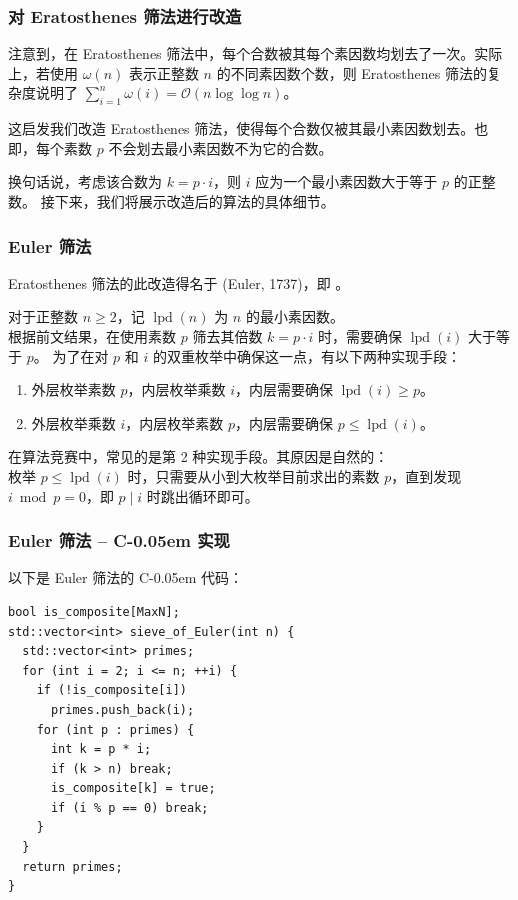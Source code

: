 \documentclass{../pkslide}
\newcommand{\Cpp}{\texorpdfstring{C\kern-0.05em\protect\raisebox{.35ex}{\textsmaller[2]{+\kern-0.05em+}}}{C++}}
\newcommand{\lpd}{\operatorname{lpd}} %
\begin{document}

\begin{frame}
  \frametitle{对 Eratosthenes 筛法进行改造}
  注意到，在 Eratosthenes 筛法中，每个合数被其每个素因数均划去了一次。实际上，若使用 $\omega(n)$ 表示正整数 $n$ 的不同素因数个数，则 Eratosthenes 筛法的复杂度说明了 $\displaystyle \sum_{i = 1}^{n} \omega(i) = \mathcal O (n \log \log n)$。
  
  \pause
  \emptyline
  这启发我们改造 Eratosthenes 筛法，使得每个合数仅被其最小素因数划去。也即，每个素数 $p$ 不会划去最小素因数不为它的合数。
  
  \pause
  \emptyline
  换句话说，考虑该合数为 $k = p \cdot i$，则 $i$ 应为一个最小素因数大于等于 $p$ 的正整数。
    \pause%
  接下来，我们将展示改造后的算法的具体细节。
\end{frame}

\begin{frame}
  \frametitle{Euler 筛法}
  Eratosthenes 筛法的此改造得名于 (Euler, 1737)，即 。
  
  \emptyline
  
  对于正整数 $n \ge 2$，记 $\lpd(n)$ 为 $n$ 的最小素因数。\\
  根据前文结果，在使用素数 $p$ 筛去其倍数 $k = p \cdot i$ 时，需要确保 $\lpd(i)$ 大于等于 $p$。%
    \pause%
  为了在对 $p$ 和 $i$ 的双重枚举中确保这一点，有以下两种实现手段：
  
  \begin{enumerate}
    \item 外层枚举素数 $p$，内层枚举乘数 $i$，内层需要确保 $\lpd(i) \ge p$。
    \item 外层枚举乘数 $i$，内层枚举素数 $p$，内层需要确保 $p \le \lpd(i)$。
  \end{enumerate}
  
  \pause
  \emptyline
  在算法竞赛中，常见的是第 2 种实现手段。其原因是自然的：\\
  枚举 $p \le \lpd(i)$ 时，只需要从小到大枚举目前求出的素数 $p$，直到发现 $i \bmod p = 0$，即 $p \mid i$ 时跳出循环即可。
\end{frame}

\begin{frame}[fragile]
  \frametitle{Euler 筛法 -- \Cpp{} 实现}
  以下是 Euler 筛法的 \Cpp{} 代码：
  
\begin{verbatim}
bool is_composite[MaxN];
std::vector<int> sieve_of_Euler(int n) {
  std::vector<int> primes;
  for (int i = 2; i <= n; ++i) {
    if (!is_composite[i])
      primes.push_back(i);
    for (int p : primes) {
      int k = p * i;
      if (k > n) break;
      is_composite[k] = true;
      if (i % p == 0) break;
    }
  }
  return primes;
}
\end{verbatim}
\end{frame}
\end{document}
